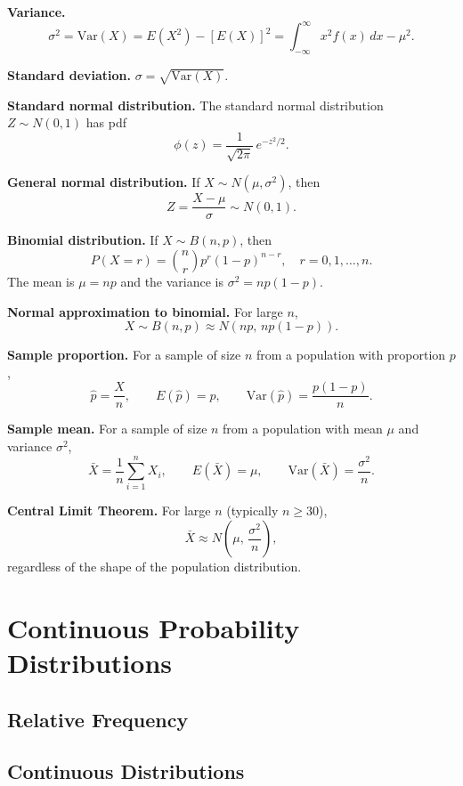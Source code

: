 \documentclass[12pt]{article}
\begin{document}
\textbf{Variance.}
\[
\sigma^2 = \mathrm{Var}(X) = E(X^2) - [E(X)]^2 = \int_{-\infty}^{\infty} x^2 f(x)\,dx - \mu^2.
\]

\textbf{Standard deviation.} $\sigma = \sqrt{\mathrm{Var}(X)}$.

\textbf{Standard normal distribution.} The standard normal distribution $Z \sim N(0,1)$ has pdf
\[
\phi(z) = \frac{1}{\sqrt{2\pi}}\,e^{-z^2/2}.
\]

\textbf{General normal distribution.} If $X \sim N(\mu, \sigma^2)$, then
\[
Z = \frac{X - \mu}{\sigma} \sim N(0,1).
\]

\textbf{Binomial distribution.} If $X \sim B(n, p)$, then
\[
P(X = r) = \binom{n}{r} p^r (1-p)^{n-r}, \quad r = 0, 1, \ldots, n.
\]
The mean is $\mu = np$ and the variance is $\sigma^2 = np(1-p)$.

\textbf{Normal approximation to binomial.} For large $n$,
\[
X \sim B(n,p) \approx N\!\left(np,\, np(1-p)\right).
\]

\textbf{Sample proportion.} For a sample of size $n$ from a population with proportion $p$,
\[
\hat{p} = \frac{X}{n}, \qquad E(\hat{p}) = p, \qquad \mathrm{Var}(\hat{p}) = \frac{p(1-p)}{n}.
\]

\textbf{Sample mean.} For a sample of size $n$ from a population with mean $\mu$ and variance $\sigma^2$,
\[
\bar{X} = \frac{1}{n}\sum_{i=1}^{n} X_i, \qquad E(\bar{X}) = \mu, \qquad \mathrm{Var}(\bar{X}) = \frac{\sigma^2}{n}.
\]

\textbf{Central Limit Theorem.} For large $n$ (typically $n \geq 30$),
\[
\bar{X} \approx N\!\left(\mu,\, \frac{\sigma^2}{n}\right),
\]
regardless of the shape of the population distribution.

\section{Continuous Probability Distributions}

\subsection{Relative Frequency}


\subsection{Continuous Distributions}

\end{document}
